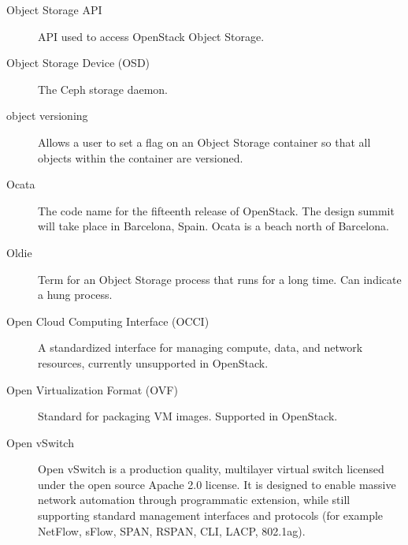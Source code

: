\documentclass[letterpaper,10pt,english]{sphinxmanual}
\begin{document}
\begin{description}
\item[{Object Storage API}] \leavevmode{}\label{_source/glossary:term-object-storage-api}
API used to access OpenStack Object Storage.

\item[{Object Storage Device (OSD)}] \leavevmode{}\label{_source/glossary:term-object-storage-device-osd}
The Ceph storage daemon.

\item[{object versioning}] \leavevmode{}\label{_source/glossary:term-object-versioning}
Allows a user to set a flag on an Object Storage container so
that all objects within the container are versioned.

\item[{Ocata}] \leavevmode{}\label{_source/glossary:term-ocata}
The code name for the fifteenth release of OpenStack. The
design summit will take place in Barcelona, Spain. Ocata is
a beach north of Barcelona.

\item[{Oldie}] \leavevmode{}\label{_source/glossary:term-oldie}
Term for an Object Storage process that runs for a long time.
Can indicate a hung process.

\item[{Open Cloud Computing Interface (OCCI)}] \leavevmode{}\label{_source/glossary:term-open-cloud-computing-interface-occi}
A standardized interface for managing compute, data, and network
resources, currently unsupported in OpenStack.

\item[{Open Virtualization Format (OVF)}] \leavevmode{}\label{_source/glossary:term-open-virtualization-format-ovf}
Standard for packaging VM images. Supported in OpenStack.

\item[{Open vSwitch}] \leavevmode{}\label{_source/glossary:term-open-vswitch}
Open vSwitch is a production quality, multilayer virtual
switch licensed under the open source Apache 2.0 license. It
is designed to enable massive network automation through
programmatic extension, while still supporting standard
management interfaces and protocols (for example NetFlow,
sFlow, SPAN, RSPAN, CLI, LACP, 802.1ag).


\end{description}
\end{document}
